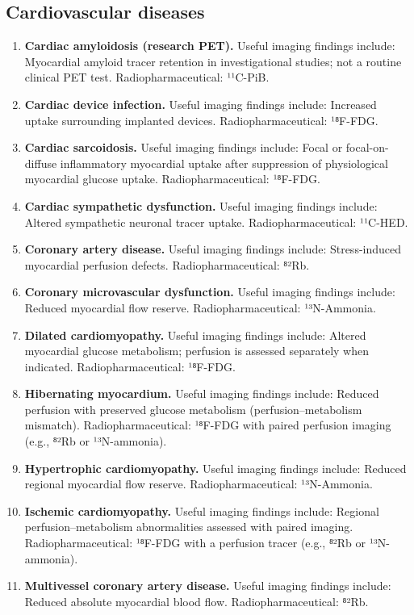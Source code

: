 \subsection{Cardiovascular diseases}
\begin{enumerate}[leftmargin=*,itemsep=0.45em,topsep=0.4em]
\item \textbf{Cardiac amyloidosis (research PET).} Useful imaging findings include: Myocardial amyloid tracer retention in investigational studies; not a routine clinical PET test. Radiopharmaceutical: ¹¹C-PiB.
\item \textbf{Cardiac device infection.} Useful imaging findings include: Increased uptake surrounding implanted devices. Radiopharmaceutical: ¹⁸F-FDG.
\item \textbf{Cardiac sarcoidosis.} Useful imaging findings include: Focal or focal-on-diffuse inflammatory myocardial uptake after suppression of physiological myocardial glucose uptake. Radiopharmaceutical: ¹⁸F-FDG.
\item \textbf{Cardiac sympathetic dysfunction.} Useful imaging findings include: Altered sympathetic neuronal tracer uptake. Radiopharmaceutical: ¹¹C-HED.
\item \textbf{Coronary artery disease.} Useful imaging findings include: Stress-induced myocardial perfusion defects. Radiopharmaceutical: ⁸²Rb.
\item \textbf{Coronary microvascular dysfunction.} Useful imaging findings include: Reduced myocardial flow reserve. Radiopharmaceutical: ¹³N-Ammonia.
\item \textbf{Dilated cardiomyopathy.} Useful imaging findings include: Altered myocardial glucose metabolism; perfusion is assessed separately when indicated. Radiopharmaceutical: ¹⁸F-FDG.
\item \textbf{Hibernating myocardium.} Useful imaging findings include: Reduced perfusion with preserved glucose metabolism (perfusion--metabolism mismatch). Radiopharmaceutical: ¹⁸F-FDG with paired perfusion imaging (e.g., ⁸²Rb or ¹³N-ammonia).
\item \textbf{Hypertrophic cardiomyopathy.} Useful imaging findings include: Reduced regional myocardial flow reserve. Radiopharmaceutical: ¹³N-Ammonia.
\item \textbf{Ischemic cardiomyopathy.} Useful imaging findings include: Regional perfusion--metabolism abnormalities assessed with paired imaging. Radiopharmaceutical: ¹⁸F-FDG with a perfusion tracer (e.g., ⁸²Rb or ¹³N-ammonia).
\item \textbf{Multivessel coronary artery disease.} Useful imaging findings include: Reduced absolute myocardial blood flow. Radiopharmaceutical: ⁸²Rb.

\end{enumerate}
